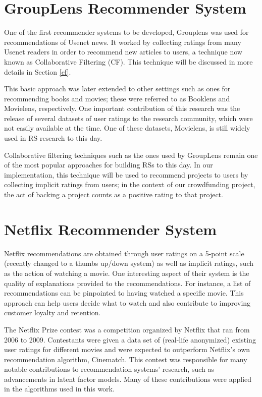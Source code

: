 \documentclass[cic,tc,english]{iiufrgs}
\begin{document}
\section{GroupLens Recommender System}
One of the first recommender systems to be developed, Grouplens \cite{N.N2010} was used for recommendations of Usenet news. It worked by collecting ratings from many Usenet readers in order to recommend new articles to users, a technique now known as Collaborative Filtering (CF). This technique will be discussed in more details in Section \ref{cf}.

This basic approach was later extended to other settings such as ones for recommending books and movies; these were referred to as Booklens and Movielens, respectively. One important contribution of this research was the release of several datasets of user ratings to the research community, which were not easily available at the time. One of these datasets, Movielens, is still widely used in RS research to this day.

Collaborative filtering techniques such as the ones used by GroupLens remain one of the most popular approaches for building RSs to this day. In our implementation, this technique will be used to recommend projects to users by collecting implicit ratings from users; in the context of our crowdfunding project, the act of backing a project counts as a positive rating to that project.

\section{Netflix Recommender System}
Netflix recommendations are obtained through user ratings on a 5-point scale (recently changed to a thumbs up/down system) as well as implicit ratings, such as the action of watching a movie. One interesting aspect of their system is the quality of explanations provided to the recommendations. For instance, a list of recommendations can be pinpointed to having watched a specific movie. This approach can help users decide what to watch and also contribute to improving customer loyalty and retention.

The Netflix Prize contest was a competition organized by Netflix that ran from 2006 to 2009. Contestants were given a data set of (real-life anonymized) existing user ratings for different movies and were expected to outperform Netflix's own recommendation algorithm, Cinematch. This contest was responsible for many notable contributions to recommendation systems' research, such as advancements in latent factor models. Many of these contributions were applied in the algorithms used in this work.
\end{document}
